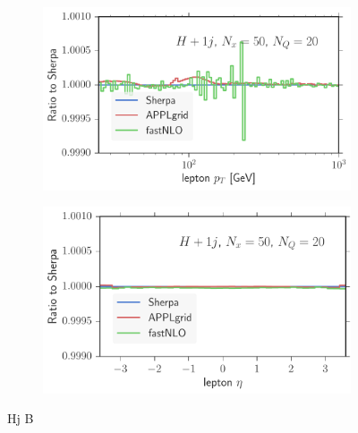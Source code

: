 \begin{figure}
\begin{subfigure}[]{0.49\textwidth}
	\includegraphics[width=\textwidth]{images/hjb_lpt.pdf}
\end{subfigure}
\hfill
\begin{subfigure}[]{0.49\textwidth}
	\includegraphics[width=\textwidth]{images/hjb_leta.pdf}
\end{subfigure}
\caption{Hj B}
\end{figure}
%
